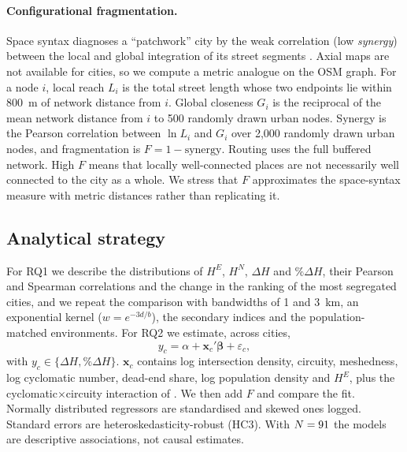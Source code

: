 \paragraph{Configurational fragmentation.} Space syntax diagnoses a ``patchwork'' city by the weak correlation
(low \emph{synergy}) between the local and global integration of its street segments \citep{medeiros2013urbis}.
Axial maps are not available for \nCities{} cities, so we compute a metric analogue on the OSM graph. For a node
$i$, local reach $L_i$ is the total street length whose two endpoints lie within 800~m of network distance from
$i$. Global closeness $G_i$ is the reciprocal of the mean network distance from $i$ to 500 randomly drawn urban
nodes. Synergy is the Pearson correlation between $\ln L_i$ and $G_i$ over 2,000 randomly drawn urban nodes,
and fragmentation is $F = 1 - \text{synergy}$. Routing uses the full buffered network. High $F$ means that
locally well-connected places are not necessarily well connected to the city as a whole. We stress that $F$
approximates the space-syntax measure with metric distances rather than replicating it.

\subsection{Analytical strategy}

For RQ1 we describe the distributions of $H^{E}$, $H^{N}$, $\Delta H$ and $\%\Delta H$, their Pearson and Spearman
correlations and the change in the ranking of the most segregated cities, and we repeat the comparison with
bandwidths of 1 and 3~km, an exponential kernel ($w = e^{-3d/b}$), the secondary indices and the
population-matched environments. For RQ2 we estimate, across cities,
\begin{equation}
  y_c = \alpha + \mathbf{x}_c'\boldsymbol\beta + \varepsilon_c ,
\end{equation}
with $y_c \in \{\Delta H, \%\Delta H\}$. $\mathbf{x}_c$ contains log intersection density, circuity, meshedness,
log cyclomatic number, dead-end share, log population density and $H^{E}$, plus the cyclomatic$\times$circuity
interaction of \citet{knaap2024segregated}. We then add $F$ and compare the fit. Normally distributed regressors
are standardised and skewed ones logged. Standard errors are heteroskedasticity-robust (HC3). With
$N = 91{}$ the models are descriptive associations, not causal estimates.
